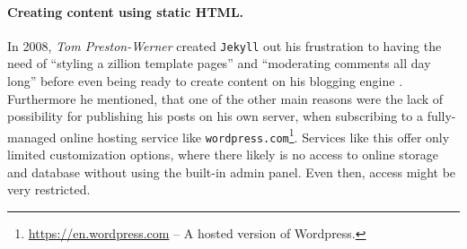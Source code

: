 \paragraph{Creating content using static HTML.}
In 2008, \emph{Tom Preston-Werner} created \texttt{Jekyll} out his frustration to having the need of ``styling a zillion template pages'' and ``moderating comments all day long'' before even being ready to create content on his blogging engine \cite[]{PrestonWerner2008}. Furthermore he mentioned, that one of the other main reasons were the lack of possibility for publishing his posts on his own server, when subscribing to a fully-managed online hosting service like \texttt{wordpress.com}\footnote{\url{https://en.wordpress.com} -- A hosted version of Wordpress.}. Services like this offer only limited customization options, where there likely is no access to online storage and database without using the built-in admin panel. Even then, access might be very restricted.


